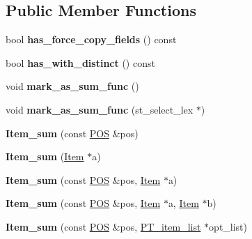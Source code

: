 \subsection*{Public Member Functions}
\begin{DoxyCompactItemize}
\item 
\mbox{\label{classItem__sum_aca14d38d7bb89085ac4472ce4350a5b2}} 
bool {\bfseries has\+\_\+force\+\_\+copy\+\_\+fields} () const
\item 
\mbox{\label{classItem__sum_a924bf27cfaf66cfcf1a76a816e8f47b2}} 
bool {\bfseries has\+\_\+with\+\_\+distinct} () const
\item 
\mbox{\label{classItem__sum_acb41146ee1289cefbc30fabaeee43a47}} 
void {\bfseries mark\+\_\+as\+\_\+sum\+\_\+func} ()
\item 
\mbox{\label{classItem__sum_a4bf026176ae23ef65a3ecf00699e2c21}} 
void {\bfseries mark\+\_\+as\+\_\+sum\+\_\+func} (st\+\_\+select\+\_\+lex $\ast$)
\item 
\mbox{\label{classItem__sum_a0f8ebe329a61b4ce86480a9af7889b8e}} 
{\bfseries Item\+\_\+sum} (const \mbox{\hyperlink{structYYLTYPE}{P\+OS}} \&pos)
\item 
\mbox{\label{classItem__sum_ab37017d1c1c59664864a89a9935969dd}} 
{\bfseries Item\+\_\+sum} (\mbox{\hyperlink{classItem}{Item}} $\ast$a)
\item 
\mbox{\label{classItem__sum_a70dd65b9202678f0a1298c7825125492}} 
{\bfseries Item\+\_\+sum} (const \mbox{\hyperlink{structYYLTYPE}{P\+OS}} \&pos, \mbox{\hyperlink{classItem}{Item}} $\ast$a)
\item 
\mbox{\label{classItem__sum_a50db265a8ee3dadf26dd78555fcf8acf}} 
{\bfseries Item\+\_\+sum} (const \mbox{\hyperlink{structYYLTYPE}{P\+OS}} \&pos, \mbox{\hyperlink{classItem}{Item}} $\ast$a, \mbox{\hyperlink{classItem}{Item}} $\ast$b)
\item 
\mbox{\label{classItem__sum_a750ba5d0fc44f789b0da26f49ac4735f}} 
{\bfseries Item\+\_\+sum} (const \mbox{\hyperlink{structYYLTYPE}{P\+OS}} \&pos, \mbox{\hyperlink{classPT__item__list}{P\+T\+\_\+item\+\_\+list}} $\ast$opt\+\_\+list)

\end{DoxyCompactItemize}
